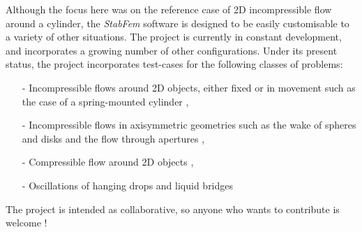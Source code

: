 \documentclass[twocolumn,10pt]{asme2ej}
\begin{document}
Although the focus here was on the reference case of 2D incompressible flow around a cylinder, the {\em StabFem } software is designed to be easily customisable to a variety of other situations.
The project is currently in constant development, and incorporates a growing number of other configurations.
Under its present status, the project incorporates test-cases for the following classes of problems:
\begin{itemize}
\item[-] Incompressible flows around 2D objects, either fixed or in movement such as the case of a spring-mounted cylinder \cite{Navrose},
\item[-] Incompressible flows in axisymmetric geometries such as the wake of spheres and disks \cite{Tchoufag2015} and the flow through apertures \cite{FabreISMA}, 
\item[-] Compressible flow around 2D objects  \cite{Fani2018}, 
\item[-] Oscillations of hanging drops and liquid bridges \cite{Chireux2015}
\end{itemize}
The project is intended as collaborative, so anyone who wants to contribute is welcome !








\appendix








\end{document}
